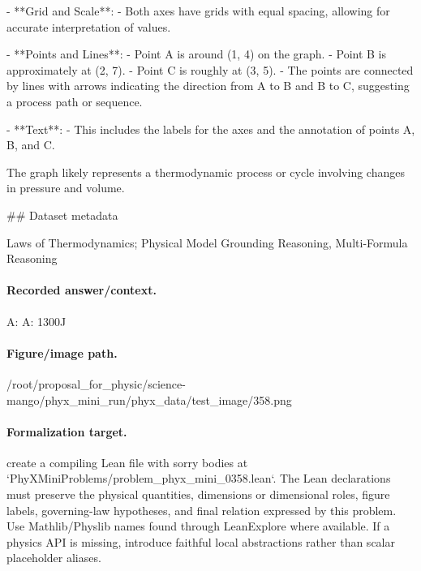 - **Grid and Scale**:
  - Both axes have grids with equal spacing, allowing for accurate interpretation of values.
  
- **Points and Lines**:
  - Point A is around (1, 4) on the graph.
  - Point B is approximately at (2, 7).
  - Point C is roughly at (3, 5).
  - The points are connected by lines with arrows indicating the direction from A to B and B to C, suggesting a process path or sequence.

- **Text**: 
  - This includes the labels for the axes and the annotation of points A, B, and C.

The graph likely represents a thermodynamic process or cycle involving changes in pressure and volume.

\#\# Dataset metadata

Laws of Thermodynamics; Physical Model Grounding Reasoning, Multi-Formula Reasoning

\paragraph{Recorded answer/context.}
A: A: 1300J

\paragraph{Figure/image path.}
/root/proposal\_for\_physic/science-mango/phyx\_mini\_run/phyx\_data/test\_image/358.png

\paragraph{Formalization target.}
create a compiling Lean file with sorry bodies at `PhyXMiniProblems/problem\_phyx\_mini\_0358.lean`. The Lean declarations must preserve the physical quantities, dimensions or dimensional roles, figure labels, governing-law hypotheses, and final relation expressed by this problem.
Use Mathlib/Physlib names found through LeanExplore where available. If a physics API is missing, introduce faithful local abstractions rather than scalar placeholder aliases.


